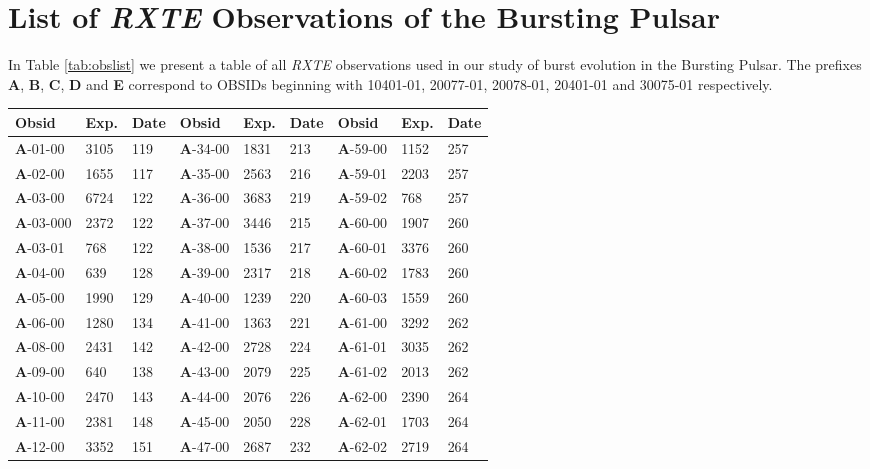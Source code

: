 \chapter{List of \textit{RXTE} Observations of the Bursting Pulsar}
\label{app:obs}

\par In Table \ref{tab:obslist} we present a table of all \indexrxte\textit{RXTE} observations used in our study of burst evolution in the Bursting Pulsar.  The prefixes \textbf{A}, \textbf{B}, \textbf{C}, \textbf{D} and \textbf{E} correspond to OBSIDs beginning with 10401-01, 20077-01, 20078-01, 20401-01 and 30075-01 respectively.

\begin{table*}
\centering
\begin{tabular}{lllllllll}
\hline
\hline
\scriptsize Obsid&\scriptsize Exp.&\scriptsize Date&\scriptsize Obsid&\scriptsize Exp.&\scriptsize Date&\scriptsize Obsid&\scriptsize Exp.&\scriptsize Date\\
\hline
\textbf{A}-01-00&3105&119&\textbf{A}-34-00&1831&213&\textbf{A}-59-00&1152&257\\
\textbf{A}-02-00&1655&117&\textbf{A}-35-00&2563&216&\textbf{A}-59-01&2203&257\\
\textbf{A}-03-00&6724&122&\textbf{A}-36-00&3683&219&\textbf{A}-59-02&768&257\\
\textbf{A}-03-000&2372&122&\textbf{A}-37-00&3446&215&\textbf{A}-60-00&1907&260\\
\textbf{A}-03-01&768&122&\textbf{A}-38-00&1536&217&\textbf{A}-60-01&3376&260\\
\textbf{A}-04-00&639&128&\textbf{A}-39-00&2317&218&\textbf{A}-60-02&1783&260\\
\textbf{A}-05-00&1990&129&\textbf{A}-40-00&1239&220&\textbf{A}-60-03&1559&260\\
\textbf{A}-06-00&1280&134&\textbf{A}-41-00&1363&221&\textbf{A}-61-00&3292&262\\
\textbf{A}-08-00&2431&142&\textbf{A}-42-00&2728&224&\textbf{A}-61-01&3035&262\\
\textbf{A}-09-00&640&138&\textbf{A}-43-00&2079&225&\textbf{A}-61-02&2013&262\\
\textbf{A}-10-00&2470&143&\textbf{A}-44-00&2076&226&\textbf{A}-62-00&2390&264\\
\textbf{A}-11-00&2381&148&\textbf{A}-45-00&2050&228&\textbf{A}-62-01&1703&264\\
\textbf{A}-12-00&3352&151&\textbf{A}-47-00&2687&232&\textbf{A}-62-02&2719&264\\

\end{tabular}
\end{table*}
